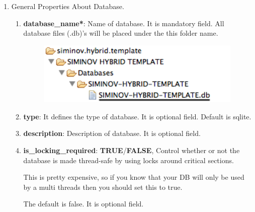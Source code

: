 \begin{enumerate}

	\item \small General Properties About Database.

		\begin{enumerate}

			\item \small \textbf{database\_name*}: Name of database. It is mandatory field. All database files (.db)'s will be placed under the this folder name.

			\begin{figure}[htbp]
				\centering
					\includegraphics[height=3cm]{Resources/siminov_hybrid_template_application_data_folder_structure_for_database_name.png}
			\end{figure}

			\item \small \textbf{type}: It defines the type of database. It is optional field. Default is sqlite.

			\item \small \textbf{description}: Description of database. It is optional field.
			\item \small \textbf{is\_locking\_required}: \textbf{TRUE}/\textbf{FALSE}, Control whether or not the database is made thread-safe by using locks around critical sections. 
				
				\par
				This is pretty expensive, so if you know that your DB will only be used by a multi threads then you should set this to true. 

				\par
				The default is false. It is optional field. 
			
			\begin{center}
				\colorbox{grey}{
					\parbox[t]{.8\linewidth}{
						\fontsize{11pt}{11pt}\selectfont %
						\vspace*{0.1cm} %
		
}}
\end{center}
\end{enumerate}
\end{enumerate}
